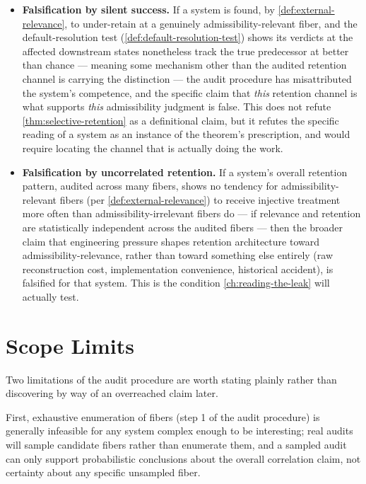\documentclass[11pt]{book}
\theoremstyle{plain}
\theoremstyle{definition}
\theoremstyle{remark}
\begin{document}
\begin{itemize}
\item \textbf{Falsification by silent success.} If a system is found,
by \cref{def:external-relevance}, to under-retain at a
genuinely admissibility-relevant fiber, and the default-resolution
test (\cref{def:default-resolution-test}) shows its verdicts at the
affected downstream states nonetheless track the true predecessor at
better than chance --- meaning some mechanism other than the audited
retention channel is carrying the distinction --- the audit procedure
has misattributed the system's competence, and the specific claim that
\emph{this} retention channel is what supports \emph{this}
admissibility judgment is false. This does not refute
\cref{thm:selective-retention} as a definitional claim, but it refutes
the specific reading of a system as an instance of the theorem's
prescription, and would require locating the channel that is actually
doing the work.
\item \textbf{Falsification by uncorrelated retention.} If a system's
overall retention pattern, audited across many fibers, shows no
tendency for admissibility-relevant fibers (per
\cref{def:external-relevance}) to receive injective treatment more
often than admissibility-irrelevant fibers do --- if relevance and
retention are statistically independent across the audited fibers ---
then the broader claim that engineering pressure shapes retention
architecture toward admissibility-relevance, rather than toward
something else entirely (raw reconstruction cost, implementation
convenience, historical accident), is falsified for that system. This
is the condition \cref{ch:reading-the-leak} will actually test.
\end{itemize}

\section{Scope Limits}

Two limitations of the audit procedure are worth stating plainly
rather than discovering by way of an overreached claim later.

First, exhaustive enumeration of fibers (step 1 of the audit
procedure) is generally infeasible for any system complex enough to be
interesting; real audits will sample candidate fibers rather than
enumerate them, and a sampled audit can only support probabilistic
conclusions about the overall correlation claim, not certainty about
any specific unsampled fiber.
\end{document}
